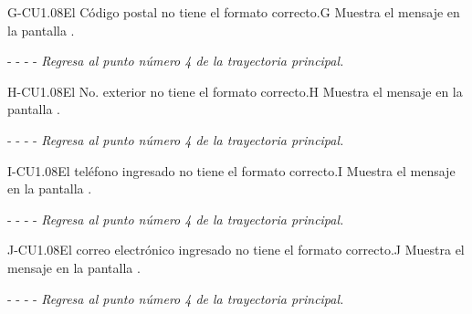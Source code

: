 	\begin{UCtrayectoriaA}{G-CU1.08}{El Código postal no tiene el formato correcto.}{G}
			\UCpaso[\UCsist] Muestra el mensaje  en la pantalla .
			\item[- -] - - {\em Regresa al punto número 4 de la trayectoria principal.} 
    \end{UCtrayectoriaA}
    
    	\begin{UCtrayectoriaA}{H-CU1.08}{El No. exterior no tiene el formato correcto.}{H}
			\UCpaso[\UCsist] Muestra el mensaje  en la pantalla .
			\item[- -] - - {\em Regresa al punto número 4 de la trayectoria principal.} 
    \end{UCtrayectoriaA}

	\begin{UCtrayectoriaA}{I-CU1.08}{El teléfono ingresado no tiene el formato correcto.}{I}
			\UCpaso[\UCsist] Muestra el mensaje  en la pantalla .
			\item[- -] - - {\em Regresa al punto número 4 de la trayectoria principal.} 
    \end{UCtrayectoriaA}
    
    \begin{UCtrayectoriaA}{J-CU1.08}{El correo electrónico ingresado no tiene el formato correcto.}{J}
			\UCpaso[\UCsist] Muestra el mensaje  en la pantalla .
			\item[- -] - - {\em Regresa al punto número 4 de la trayectoria principal.} 
    \end{UCtrayectoriaA}